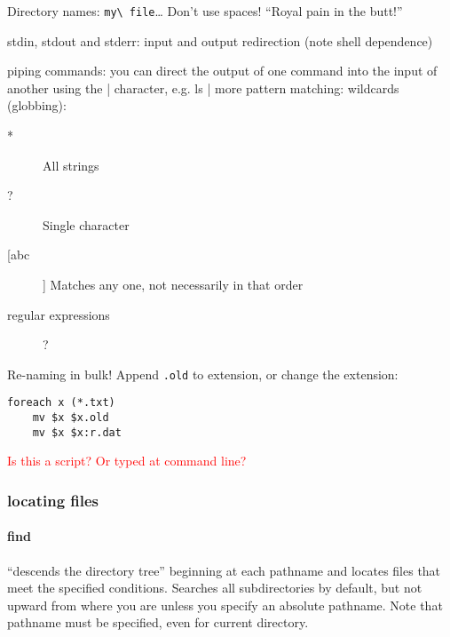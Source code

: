\documentclass{article}
\begin{document}
Directory names: \verb|my\ file|\ldots
Don't use spaces! ``Royal pain in the butt!''

stdin, stdout and stderr: input and output redirection (note shell
dependence)

piping commands: you can direct the output of one command into the
input of another using the | character, e.g. ls | more
pattern matching: wildcards (globbing):
\begin{description}
    \item [*] All strings
    \item [?] Single character
    \item [[abc]] Matches any one, not necessarily in that order
    \item [regular expressions] ?
\end{description}
Re-naming in bulk! Append \verb|.old| to extension, or change the extension:
\begin{verbatim}
foreach x (*.txt)
    mv $x $x.old
    mv $x $x:r.dat
\end{verbatim}
\textcolor{red}{Is this a script? Or typed at command line?}

\subsubsection{locating files}
\paragraph{\ttfamily find}
``descends the directory tree'' beginning at each
pathname and locates files that meet the
specified conditions. Searches all subdirectories by default,
but not upward from where you are unless you specify an absolute pathname.
Note that pathname must be specified, even for current directory.
\end{document}

